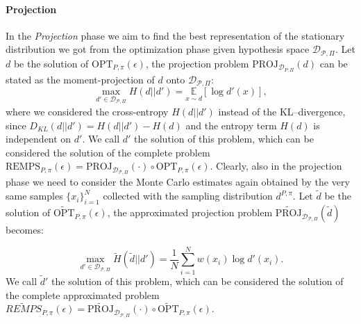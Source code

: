 \paragraph{Projection} In the \textit{Projection} phase we aim to find the best representation of the stationary distribution we got from the optimization phase given hypothesis space $\mathcal{D}_{\mathcal{P}, \Pi}$. Let $d$ be the solution of $\text{OPT}_{P,\pi}(\epsilon)$, the projection problem $\text{PROJ}_{\mathcal{D}_{P,\Pi}}(d)$ can be stated as the moment-projection of $d$ onto $\mathcal{D}_{\mathcal{P},\Pi}$:
\begin{equation}
	\max_{d' \in \mathcal{D}_{\mathcal{P}, \Pi}} H(d||d') = \underset{x \sim d}{\mathbb{E}} \left[ \log d'(x) \right],
\end{equation}
where we considered the cross-entropy $H(d||d')$ instead of the KL--divergence, since \newline $D_{KL}(d||d')= H(d||d') - H(d)$ and the entropy term $H(d)$ is independent on $d'$. We call $d'$ the solution of this problem, which can be considered the solution of the complete problem $\text{REMPS}_{P,\pi}(\epsilon) = \text{PROJ}_{\mathcal{D}_{\mathcal{P}, \Pi}}(\cdot) \circ \text{OPT}_{P,\pi}(\epsilon)$. Clearly, also in the projection phase we need to consider the Monte Carlo estimates again obtained by the very same samples $\{x_i\}_{i=1}^N$ collected with the sampling distribution $d^{P,\pi}$. Let $\widetilde{d}$ be the solution of $\widetilde{\text{OPT}}_{P,\pi}(\epsilon)$, the approximated projection problem $\widetilde{\text{PROJ}}_{\mathcal{D}_{\mathcal{P},\Pi}}(\widetilde{d})$ becomes:

\begin{equation}
	\max_{d' \in \mathcal{D}_{\mathcal{P}, \Pi}} \widetilde{H}(\widetilde{d}||d') = \frac{1}{N} \sum_{i=1}^N w(x_i) \log d'(x_i) .
\end{equation}
We call $\widetilde{d}'$ the solution of this problem, which can be considered the solution of the complete approximated problem $\widetilde{REMPS}_{P,\pi}(\epsilon) = \widetilde{\text{PROJ}}_{\mathcal{D}_{\mathcal{P},\Pi}}(\cdot) \circ \widetilde{\text{OPT}}_{P,\pi}(\epsilon)$.

